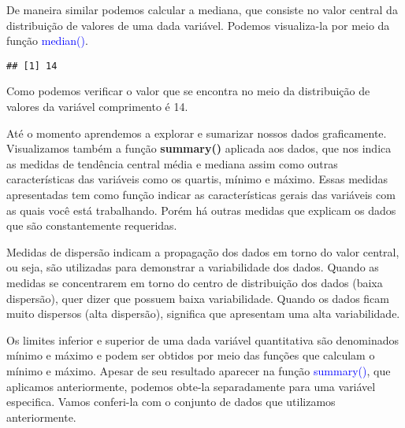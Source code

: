\documentclass[titlepage, oneside, openany, a4paper]{book}
\newenvironment{Shaded}{\begin{snugshade}}{\end{snugshade}}
\newcommand{\KeywordTok}[1]{\textcolor[rgb]{0.13,0.29,0.53}{\textbf{#1}}}
\newcommand{\NormalTok}[1]{#1}
\newcommand{\OperatorTok}[1]{\textcolor[rgb]{0.81,0.36,0.00}{\textbf{#1}}}
\begin{document}
De maneira similar podemos calcular a mediana, que consiste no valor central da distribuição de valores de uma dada variável. Podemos visualiza-la por meio da função \textcolor{blue}{median()}.

\begin{Shaded}
\end{Shaded}

\begin{verbatim}
## [1] 14
\end{verbatim}

Como podemos verificar o valor que se encontra no meio da distribuição de valores da variável comprimento é 14.

Até o momento aprendemos a explorar e sumarizar nossos dados graficamente. Visualizamos também a função \textbf{summary()} aplicada aos dados, que nos indica as medidas de tendência central média e mediana assim como outras características das variáveis como os quartis, mínimo e máximo. Essas medidas apresentadas tem como função indicar as características gerais das variáveis com as quais você está trabalhando. Porém há outras medidas que explicam os dados que são constantemente requeridas.

Medidas de dispersão indicam a propagação dos dados em torno do valor central, ou seja, são utilizadas para demonstrar a variabilidade dos dados. Quando as medidas se concentrarem em torno do centro de distribuição dos dados (baixa dispersão), quer dizer que possuem baixa variabilidade. Quando os dados ficam muito dispersos (alta dispersão), significa que apresentam uma alta variabilidade.

Os limites inferior e superior de uma dada variável quantitativa são denominados mínimo e máximo e podem ser obtidos por meio das funções que calculam o mínimo e máximo. Apesar de seu resultado aparecer na função \textcolor{blue}{summary()}, que aplicamos anteriormente, podemos obte-la separadamente para uma variável especifica. Vamos conferi-la com o conjunto de dados que utilizamos anteriormente.

\begin{Shaded}
\end{Shaded}
\end{document}
